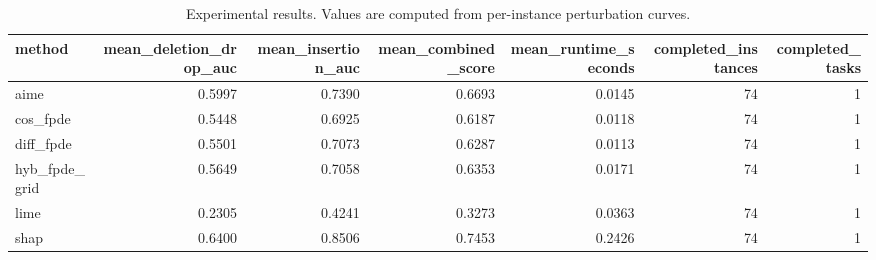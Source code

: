 \begin{table}[t]
\caption{Experimental results. Values are computed from per-instance perturbation curves.}
\label{tab:main_results_computed}
\centering
\begin{tabular}{lrrrrrr}
\toprule
method & mean\_deletion\_drop\_auc & mean\_insertion\_auc & mean\_combined\_score & mean\_runtime\_seconds & completed\_instances & completed\_tasks \\
\midrule
aime & 0.5997 & 0.7390 & 0.6693 & 0.0145 & 74 & 1 \\
cos\_fpde & 0.5448 & 0.6925 & 0.6187 & 0.0118 & 74 & 1 \\
diff\_fpde & 0.5501 & 0.7073 & 0.6287 & 0.0113 & 74 & 1 \\
hyb\_fpde\_grid & 0.5649 & 0.7058 & 0.6353 & 0.0171 & 74 & 1 \\
lime & 0.2305 & 0.4241 & 0.3273 & 0.0363 & 74 & 1 \\
shap & 0.6400 & 0.8506 & 0.7453 & 0.2426 & 74 & 1 \\
\bottomrule
\end{tabular}

\end{table}
